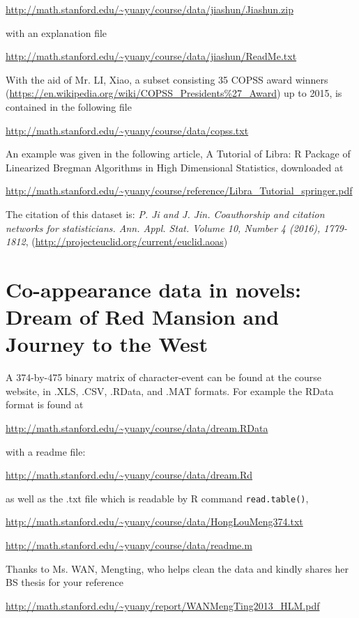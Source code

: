 \documentclass[11pt]{article}
\begin{document}
\url{http://math.stanford.edu/~yuany/course/data/jiashun/Jiashun.zip}

\noindent with an explanation file

\url{http://math.stanford.edu/~yuany/course/data/jiashun/ReadMe.txt}

With the aid of Mr. LI, Xiao, a subset consisting 35 COPSS award winners (\url{https://en.wikipedia.org/wiki/COPSS_Presidents\%27_Award}) up to 2015, is contained in the following file

\url{http://math.stanford.edu/~yuany/course/data/copss.txt} 

\noindent An example was given in the following article, A Tutorial of Libra: R Package of Linearized Bregman Algorithms in High Dimensional Statistics, downloaded at

\url{http://math.stanford.edu/~yuany/course/reference/Libra_Tutorial_springer.pdf}

The citation of this dataset is: \emph{P. Ji and J. Jin. Coauthorship and citation networks for statisticians. Ann. Appl. Stat. Volume 10, Number 4 (2016), 1779-1812}, (\url{http://projecteuclid.org/current/euclid.aoas})




\section{Co-appearance data in novels: Dream of Red Mansion and Journey to the West}

A 374-by-475 binary matrix of character-event can be found at the course website, in .XLS, .CSV, .RData, and .MAT formats. For example the RData format is found at

\url{http://math.stanford.edu/~yuany/course/data/dream.RData} 

\noindent with a readme file:

\url{http://math.stanford.edu/~yuany/course/data/dream.Rd}

\noindent as well as the .txt file which is readable by R command {\tt read.table()},

\url{http://math.stanford.edu/~yuany/course/data/HongLouMeng374.txt}

\url{http://math.stanford.edu/~yuany/course/data/readme.m}

Thanks to Ms. WAN, Mengting, who helps clean the data and kindly shares her BS thesis for your reference
 
\url{http://math.stanford.edu/~yuany/report/WANMengTing2013_HLM.pdf}
\end{document}
